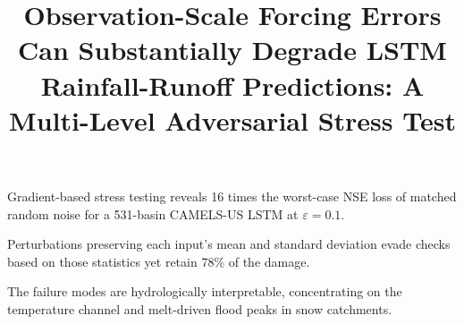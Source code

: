 \documentclass[final]{agujournal2019}
\begin{document}
\title{Observation-Scale Forcing Errors Can Substantially Degrade LSTM Rainfall-Runoff Predictions: A Multi-Level Adversarial Stress Test}



\begin{keypoints}
\item Gradient-based stress testing reveals 16 times the worst-case NSE loss of matched random noise for a 531-basin CAMELS-US LSTM at $\varepsilon{=}0.1$.
\item Perturbations preserving each input's mean and standard deviation evade checks based on those statistics yet retain 78\% of the damage.
\item The failure modes are hydrologically interpretable, concentrating on the temperature channel and melt-driven flood peaks in snow catchments.
\end{keypoints}
\end{document}
